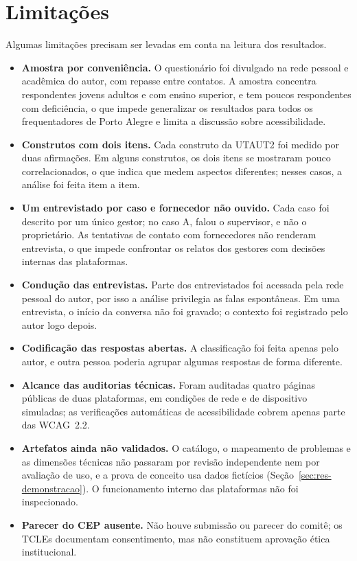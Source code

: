 \section{Limitações}
\label{sec:conc-limitacoes}

Algumas limitações precisam ser levadas em conta na leitura dos resultados.

\begin{itemize}
    \item \textbf{Amostra por conveniência.} O questionário foi divulgado na rede pessoal e acadêmica do autor, com repasse entre contatos. A amostra concentra respondentes jovens adultos e com ensino superior, e tem poucos respondentes com deficiência, o que impede generalizar os resultados para todos os frequentadores de Porto Alegre e limita a discussão sobre acessibilidade.
    \item \textbf{Construtos com dois itens.} Cada construto da UTAUT2 foi medido por duas afirmações. Em alguns construtos, os dois itens se mostraram pouco correlacionados, o que indica que medem aspectos diferentes; nesses casos, a análise foi feita item a item.
    \item \textbf{Um entrevistado por caso e fornecedor não ouvido.} Cada caso foi descrito por um único gestor; no caso A, falou o supervisor, e não o proprietário. As tentativas de contato com fornecedores não renderam entrevista, o que impede confrontar os relatos dos gestores com decisões internas das plataformas.
    \item \textbf{Condução das entrevistas.} Parte dos entrevistados foi acessada pela rede pessoal do autor, por isso a análise privilegia as falas espontâneas. Em uma entrevista, o início da conversa não foi gravado; o contexto foi registrado pelo autor logo depois.
    \item \textbf{Codificação das respostas abertas.} A classificação foi feita apenas pelo autor, e outra pessoa poderia agrupar algumas respostas de forma diferente.
    \item \textbf{Alcance das auditorias técnicas.} Foram auditadas quatro páginas públicas de duas plataformas, em condições de rede e de dispositivo simuladas; as verificações automáticas de acessibilidade cobrem apenas parte das WCAG~2.2.
    \item \textbf{Artefatos ainda não validados.} O catálogo, o mapeamento de problemas e as dimensões técnicas não passaram por revisão independente nem por avaliação de uso, e a prova de conceito usa dados fictícios (Seção~\ref{sec:res-demonstracao}). O funcionamento interno das plataformas não foi inspecionado.
    \item \textbf{Parecer do CEP ausente.} Não houve submissão ou parecer do comitê; os TCLEs documentam consentimento, mas não constituem aprovação ética institucional.
\end{itemize}


